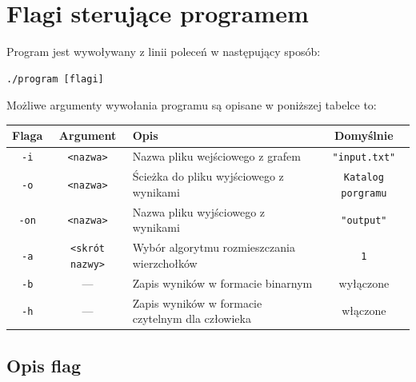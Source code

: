 \documentclass[12pt]{article}
\begin{document}
\section{Flagi sterujące programem}

Program jest wywoływany z linii poleceń w następujący sposób:

\begin{verbatim}
./program [flagi]
\end{verbatim}
Możliwe argumenty wywołania programu są opisane w poniższej tabelce to:

\begin{center}
	\begin{tabular}{|c|c|p{7cm}|c|}
		\hline
		\textbf{Flaga} & \textbf{Argument}      & \textbf{Opis}                                    & \textbf{Domyślnie} \\
		\hline
		\texttt{-i}    & \texttt{<nazwa>}     & Nazwa pliku wejściowego z grafem            & \texttt{"input.txt"}   \\
		\hline
		\texttt{-o}    & \texttt{<nazwa>}     & Ścieżka do pliku wyjściowego z wynikami         & \texttt{Katalog porgramu}  \\
		\hline
        \texttt{-on}    & \texttt{<nazwa>}     & Nazwa pliku wyjściowego z wynikami          & \texttt{"output"}  \\
		\hline
		\texttt{-a}    & \texttt{<skrót nazwy>} & Wybór algorytmu rozmieszczania wierzchołków      & \texttt{1}         \\
		\hline
		\texttt{-b}    & —                      & Zapis wyników w formacie binarnym                & wyłączone          \\
		\hline
		\texttt{-h}    & —                      & Zapis wyników w formacie czytelnym dla człowieka & włączone          \\
		\hline
	\end{tabular}
\end{center}

\subsection{Opis flag}
\end{document}
